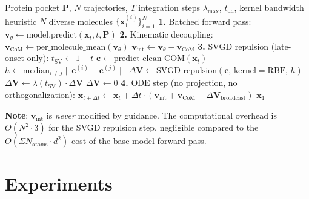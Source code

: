 \documentclass[a4paper,11pt]{article}
\begin{document}
\begin{algorithm}[H]
\caption{SV-Flow Core Sampling}
\label{alg:svflow}
\begin{algorithmic}[1]
\REQUIRE Protein pocket $\mathbf{P}$, $N$ trajectories, $T$ integration steps
\REQUIRE $\lambda_{\text{max}}$, $t_{\text{on}}$, kernel bandwidth heuristic
\ENSURE $N$ diverse molecules $\{\mathbf{x}_1^{(i)}\}_{i=1}^N$
  \STATE \textbf{1.} Batched forward pass:
    $\mathbf{v}_\theta \leftarrow \text{model.predict}(\mathbf{x}_t, t, \mathbf{P})$
  \STATE
  \STATE \textbf{2.} Kinematic decoupling:
  \STATE \quad $\mathbf{v}_{\text{CoM}} \leftarrow \text{per\_molecule\_mean}(\mathbf{v}_\theta)$
  \STATE \quad $\mathbf{v}_{\text{int}} \leftarrow \mathbf{v}_\theta - \mathbf{v}_{\text{CoM}}$
  \STATE
  \STATE \textbf{3.} SVGD repulsion (late-onset only):
  \STATE \quad $t_{\text{SV}} \leftarrow 1 - t$
    \STATE \quad\quad $\mathbf{c} \leftarrow \text{predict\_clean\_COM}(\mathbf{x}_t)$
    \STATE \quad\quad $h \leftarrow \text{median}_{i \neq j} \|\mathbf{c}^{(i)} - \mathbf{c}^{(j)}\|$
    \STATE \quad\quad $\Delta\mathbf{V} \leftarrow \text{SVGD\_repulsion}(\mathbf{c},\, \text{kernel}=\text{RBF},\, h)$
    \STATE \quad\quad $\Delta\mathbf{V} \leftarrow \lambda(t_{\text{SV}}) \cdot \Delta\mathbf{V}$
  \ELSE
    \STATE \quad\quad $\Delta\mathbf{V} \leftarrow 0$
  \ENDIF
  \STATE
  \STATE \textbf{4.} ODE step (no projection, no orthogonalization):
  \STATE \quad $\mathbf{x}_{t + \Delta t} \leftarrow \mathbf{x}_t + \Delta t \cdot
    (\mathbf{v}_{\text{int}} + \mathbf{v}_{\text{CoM}} + \Delta\mathbf{V}_{\text{broadcast}})$
\ENDFOR
\RETURN $\mathbf{x}_1$
\end{algorithmic}
\end{algorithm}

\noindent\textbf{Note}: $\mathbf{v}_{\text{int}}$ is \emph{never} modified by
guidance.  The computational overhead is $O(N^2 \cdot 3)$ for the SVGD repulsion
step, negligible compared to the $O(\Sigma N_{\text{atoms}} \cdot d^2)$ cost of
the base model forward pass.

\section{Experiments}
\label{sec:experiments}
\end{document}
